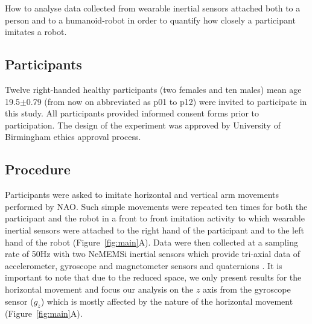 \documentclass{sig-alternate-05-2015}
\begin{document}
How to analyse  data collected from wearable inertial sensors attached both 
to a person and to a humanoid-robot in order to quantify how closely a participant 
imitates a robot.










\subsection{Participants}
Twelve right-handed healthy participants (two females and ten males)
mean age 19.5$\pm$0.79 (from now on abbreviated as p01 to p12) were invited to 
participate in this study. 
All participants provided informed consent forms prior to participation.
The design of the experiment was approved by University of Birmingham ethics approval
process. 


% 
\subsection{Procedure}
Participants were asked to imitate horizontal and vertical arm movements
performed by NAO.
Such simple movements were repeated ten times for both the participant and the robot
 in a front to front imitation activity
 to which
 wearable inertial sensors were attached to the right hand of the participant and to the left hand of the robot
(Figure~\ref{fig:main}A).
Data were then collected at a sampling rate of 50Hz with two NeMEMSi inertial sensors
which provide tri-axial data of accelerometer, gyroscope and magnetometer sensors and
quaternions \cite{Comotti2014}. 
It is important to note that due to the reduced space, we only present
results for the horizontal movement and focus our analysis on the $z$ axis from the gyroscope sensor ($g_z$) 
which is mostly affected by the nature of the horizontal movement (Figure~\ref{fig:main}A).
\end{document}
